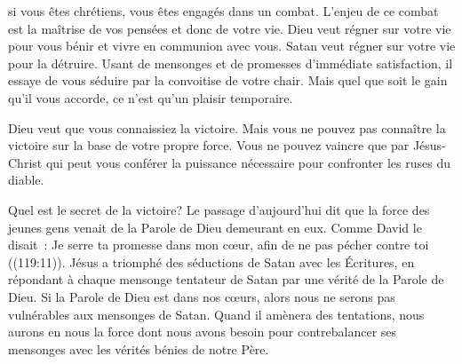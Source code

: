




 si vous êtes chrétiens,
 vous êtes engagés dans un combat. L'enjeu de ce combat est la maîtrise
 de vos pensées et donc de votre vie. Dieu veut régner sur votre vie
 pour vous bénir et vivre en communion avec vous.
 Satan veut régner sur votre vie pour la détruire.
 Usant de mensonges et de promesses d'immédiate satisfaction,
 il essaye de vous séduire par la convoitise de votre chair.
 Mais quel que soit le gain qu'il vous accorde,
 ce n'est qu'un plaisir temporaire.


Dieu veut que vous connaissiez la victoire. Mais vous ne pouvez pas connaître
 la victoire sur la base de votre propre force. Vous ne pouvez vaincre
 que par Jésus-Christ qui peut vous conférer la puissance nécessaire pour
 confronter les ruses du diable.

Quel est le secret de la victoire? Le passage d'aujourd'hui dit que la force
 des jeunes gens venait de la Parole de Dieu demeurant en eux.
 Comme David le disait~: 
 \og Je serre ta promesse dans mon cœur, afin de ne pas pécher contre toi \fg{}
 ((119:11)).
 Jésus a triomphé des séductions de Satan avec les Écritures, en répondant
 à chaque mensonge tentateur de Satan par une vérité de la Parole de Dieu.
 Si la Parole de Dieu est dans nos c\oe{}urs, alors nous ne serons pas
 vulnérables aux mensonges de Satan.
 Quand il amènera des tentations, nous aurons en nous la force dont nous
 avons besoin pour contrebalancer ses mensonges avec les vérités bénies 
 de notre Père.


\dvrule






